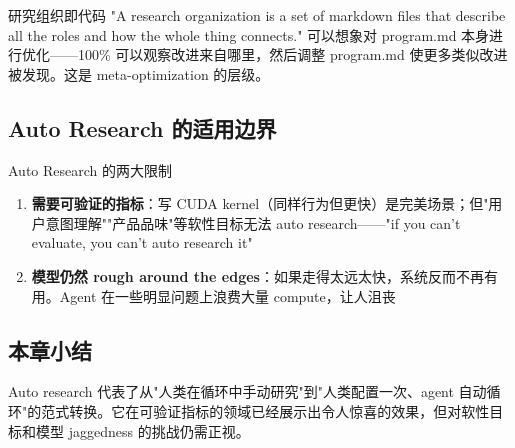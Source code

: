 \begin{importantbox}{研究组织即代码}
"A research organization is a set of markdown files that describe all the roles and how the whole thing connects." 可以想象对 program.md 本身进行优化——100\% 可以观察改进来自哪里，然后调整 program.md 使更多类似改进被发现。这是 meta-optimization 的层级。
\end{importantbox}

\subsection{Auto Research 的适用边界}

\begin{warningbox}{Auto Research 的两大限制}
\begin{enumerate}
    \item \textbf{需要可验证的指标}：写 CUDA kernel（同样行为但更快）是完美场景；但"用户意图理解""产品品味"等软性目标无法 auto research——"if you can't evaluate, you can't auto research it"
    \item \textbf{模型仍然 rough around the edges}：如果走得太远太快，系统反而不再有用。Agent 在一些明显问题上浪费大量 compute，让人沮丧
\end{enumerate}
\end{warningbox}

\subsection{本章小结}

Auto research 代表了从"人类在循环中手动研究"到"人类配置一次、agent 自动循环"的范式转换。它在可验证指标的领域已经展示出令人惊喜的效果，但对软性目标和模型 jaggedness 的挑战仍需正视。


